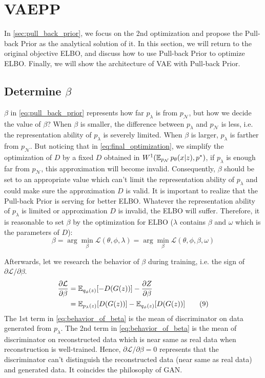 \section{VAEPP}\label{sec:vaepp}


In \cref{sec:pull_back_prior}, we focus on the 2nd optimization and propose the Pull-back Prior as the analytical solution of it. In this section, we will return to the original objective ELBO, and discuss how to use Pull-back Prior to optimize ELBO. Finally, we will show the architecture of VAE with Pull-back Prior. 

\subsection{Determine $\beta$}

$\beta$ in \cref{eq:pull_back_prior} represents how far $p_\lambda$ is from $p_\mathcal{N}$, but how we decide the value of $\beta$? When $\beta$ is smaller, the difference between $p_\lambda$ and $p_\mathcal{N}$ is less, i.e. the representation ability of $p_\lambda$ is severely limited. When $\beta$ is larger, $p_\lambda$ is farther from $p_\mathcal{N}$. But noticing that in \cref{eq:final_optimization}, we simplify the optimization of $D$ by a fixed $D$ obtained in $W^1(\operatorname{\mathbb{E}}_{p_\mathcal{N}}p_\theta(x|z), p^*)$, if $p_\lambda$ is enough far from $p_\mathcal{N}$, this approximation will become invalid. Consequently, $\beta$ should be set to an appropriate value which can't limit the representation ability of $p_\lambda$ and could make sure the approximation $D$ is valid. It is important to realize that the Pull-back Prior is serving for better ELBO. Whatever the representation ability of $p_\lambda$ is limited or approximation $D$ is invalid, the ELBO will suffer. Therefore, it is reasonable to set $\beta$ by the optimization for ELBO ($\lambda$ contains $\beta$ and $\omega$ which is the parameters of $D$):
\begin{equation}
	\beta = \arg \min_{\beta} \mathcal{L}(\theta, \phi, \lambda) = \arg \min_{\beta} \mathcal{L}(\theta, \phi, \beta, \omega) \tag{8}
\end{equation}

Afterwards, let we research the behavior of $\beta$ during training, i.e. the sign of $\partial \mathcal{L}/\partial \beta$.
\begin{align*}\label{eq:behavior_of_beta}
\frac{\partial \mathcal{L}}{\partial \beta} &= \operatorname{\mathbb{E}}_{q_\phi(z)}[ -D(G(z))] - \frac{\partial Z}{\partial \beta} \\
&= \operatorname{\mathbb{E}}_{p_\lambda(z)}[ D(G(z))] - \operatorname{\mathbb{E}}_{q_\phi(z)}[ D(G(z))]  \tag{9}
\end{align*}
The 1st term in \cref{eq:behavior_of_beta} is the mean of discriminator on data generated from $p_\lambda$. The 2nd term in \cref{eq:behavior_of_beta} is the mean of discriminator on reconstructed data which is near same as real data when reconstruction is well-trained. Hence, $\partial \mathcal{L}/\partial \beta = 0$ represents that the discriminator can't distinguish the reconstructed data (near same as real data) and generated data. It coincides the philosophy of GAN. 

